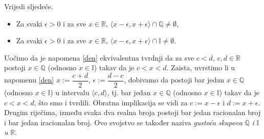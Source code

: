 \begin{remark} Vrijedi sljedeće.
\label{den}
\textbf{}
\begin{itemize}
\item[a)] Za svaki \(\epsilon>0\) i za sve \(x\in \mathbb{R}\), \(\langle x-\epsilon, x+\epsilon\rangle\cap \mathbb{Q}\neq \emptyset\),
\item[b)] Za svaki \(\epsilon>0\) i za sve \(x\in \mathbb{R}\), \(\langle x-\epsilon, x+\epsilon\rangle\cap \mathbb{I}\neq \emptyset\).
\end{itemize}
\end{remark}
Uočimo da je napomena \ref{den} ekvivalentna tvrdnji da za sve \(c<d\), \(c, d\in \mathbb{R}\) postoji \(x\in \mathbb{Q}\) (odnosno $x\in \mathbb{I}$) takav da je \(c<x<d\). Zaista, uvrstimo li u napomenu \ref{den} \(x:=\dfrac{c+d}{2}\), \(\epsilon:=\dfrac{d-c}{2}\), dobivamo da postoji bar jedan \(x\in \mathbb{Q}\) (odnosno \(x\in \mathbb{I}\)) u intervalu \(\langle c, d\rangle\), tj. bar jedan \(x\in \mathbb{Q}\) (odnosno \(x\in \mathbb{I}\)) takav da je \(c<x<d\), što smo i tvrdili. Obratna implikacija se vidi za $c:=x-\epsilon$ i $d:=x+\epsilon$. Drugim riječima, između svaka dva realna broja postoji bar jedan racionalan broj i bar jedan iracionalan broj. Ovo svojstvo se također naziva \textit{gustoća skupova} $\mathbb{Q}$ \textit{i} $\mathbb{I}$ \textit{u} $\mathbb{R}$.

